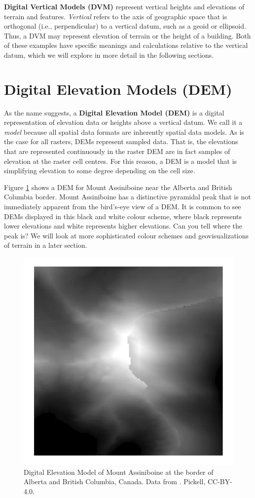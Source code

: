 \documentclass[
]{book}
\begin{document}
\textbf{Digital Vertical Models (DVM)} represent vertical heights and elevations of terrain and features. \emph{Vertical} refers to the axis of geographic space that is orthogonal (i.e., perpendicular) to a vertical datum, such as a geoid or ellipsoid. Thus, a DVM may represent elevation of terrain or the height of a building. Both of these examples have specific meanings and calculations relative to the vertical datum, which we will explore in more detail in the following sections.

\section{Digital Elevation Models (DEM)}\label{digital-elevation-models-dem}

As the name suggests, a \textbf{Digital Elevation Model (DEM)} is a digital representation of elevation data or heights above a vertical datum. We call it a \emph{model} because all spatial data formats are inherently spatial data models. As is the case for all rasters, DEMs represent sampled data. That is, the elevations that are represented continuously in the raster DEM are in fact samples of elevation at the raster cell centres. For this reason, a DEM is a model that is simplifying elevation to some degree depending on the cell size.

Figure \ref{fig:9-mount-assiniboine-dem} shows a DEM for Mount Assiniboine near the Alberta and British Columbia border. Mount Assiniboine has a distinctive pyramidal peak that is not immediately apparent from the bird's-eye view of a DEM. It is common to see DEMs displayed in this black and white colour scheme, where black represents lower elevations and white represents higher elevations. Can you tell where the peak is? We will look at more sophisticated colour schemes and geovisualizations of terrain in a later section.



\begin{figure}
\includegraphics[width=0.75\linewidth]{images/09-mount-assiniboine-dem} \caption{Digital Elevation Model of Mount Assiniboine at the border of Alberta and British Columbia, Canada. Data from \citep{natural_resources_canada_canadian_2015}. Pickell, CC-BY-4.0.}\label{fig:9-mount-assiniboine-dem}
\end{figure}
\end{document}

